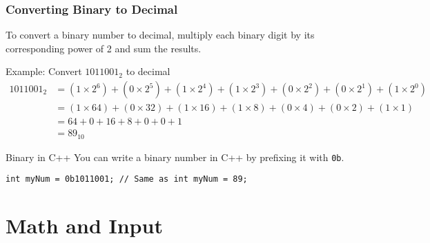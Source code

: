 \documentclass{beamer}
\begin{document}
\begin{frame}
\frametitle{Converting Binary to Decimal}
To convert a binary number to decimal, multiply each binary digit by its corresponding power of 2 and sum the results.

\begin{exampleblock}{Example: Convert $1011001_2$ to decimal}
\begin{align*}
1011001_2 &= (1 \times 2^6) + (0 \times 2^5) + (1 \times 2^4) + (1 \times 2^3) + (0 \times 2^2) + (0 \times 2^1) + (1 \times 2^0) \\
&= (1 \times 64) + (0 \times 32) + (1 \times 16) + (1 \times 8) + (0 \times 4) + (0 \times 2) + (1 \times 1) \\
&= 64 + 0 + 16 + 8 + 0 + 0 + 1 \\
&= 89_{10}
\end{align*}
\end{exampleblock}

\begin{alertblock}{Binary in C++}
You can write a binary number in C++ by prefixing it with \texttt{0b}.
\end{alertblock}
\texttt{int myNum = 0b1011001; // Same as int myNum = 89;}
\end{frame}

\section{Math and Input}
\end{document}

